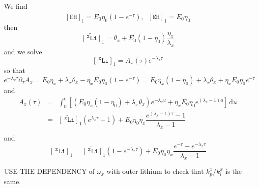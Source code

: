 \documentclass[aps,onecolumn,11pt]{revtex4}
\newcommand{\mychem}[1]{\mathtt{#1}}
\newcommand{\myconc}[1]{\left\lbrack{#1}\right\rbrack}
\newcommand{\spLi}[1]{{~^{\mychem{#1}}\mychem{Li}}}
\newcommand{\Li}[1]{\myconc{\spLi{#1}}}
\newcommand{\spEHin}{\mychem{EH}}
\newcommand{\EHin}{\myconc{\spEHin}}
\begin{document}
We find
\begin{equation}
	\EHin_1 = E_0\eta_0 \left(1-e^{ -\tau}\right), \;\; \widetilde{\EHin}_1 = E_0\eta_0
\end{equation}
then
\begin{equation}
	\widetilde{\Li{x}}_1 = \theta_x + E_0\left(1-\eta_0\right) \dfrac{\eta_x}{\lambda_x}
\end{equation}
and we solve
\begin{equation}
	\Li{x}_1 = A_x(\tau) e^{-\lambda_x \tau}
\end{equation}
so that
\begin{equation}
	e^{-\lambda_x \tau}\partial_\tau A_x   = E_0\eta_x + \lambda_x \theta_x - \eta_x E_0\eta_0 \left(1-e^{ -\tau}\right)
	= E_0\eta_x(1-\eta_0) + \lambda_x \theta_x + \eta_x E_0\eta_0 e^{ -\tau}
\end{equation}
and
\begin{equation}
\begin{array}{rcl}
	A_x(\tau) &= & \displaystyle \int_{0}^t 
	\left\lbrack \left(E_0\eta_x(1-\eta_0)  + \lambda_x \theta_x \right) e^{-\lambda_x u}
	+ \eta_x E_0\eta_0 e^{ (\lambda_x-1)u}\right\rbrack \, \mathrm{d}u\\
	& = & \widetilde{\Li{x}}_1 \left(e^{\lambda_x \tau}-1\right) 
	+ E_0\eta_0\eta_x \dfrac{e^{(\lambda_x-1)\tau}-1}{\lambda_x-1}\\
	\end{array}
\end{equation}
and
\begin{equation}
	\Li{x}_1 = \widetilde{\Li{x}}_1 \left(1-e^{-\lambda_x \tau}\right) 
	+ E_0\eta_0\eta_x \dfrac{e^{-\tau}-e^{-\lambda_x\tau}}{\lambda_x-1}
\end{equation}


USE THE DEPENDENCY of $\omega_x$ with outer lithium to check that $k_p^x/k_l^x$ is the same.
\end{document}
